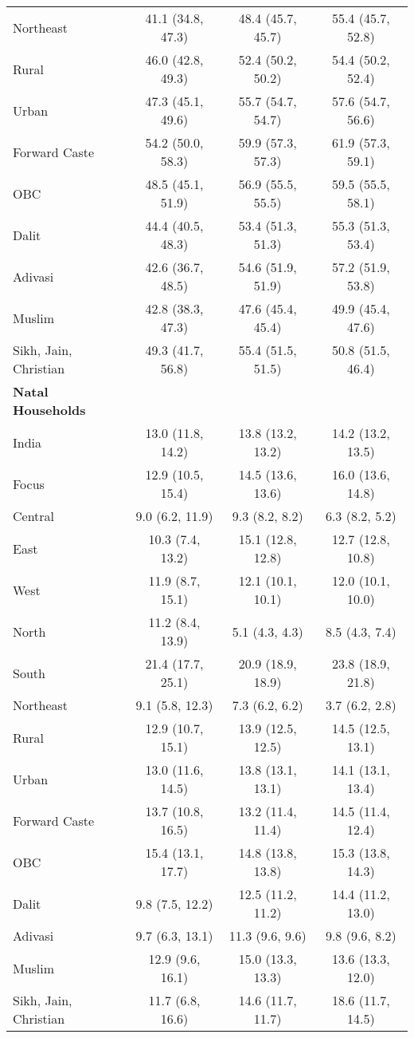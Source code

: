 \begin{tabular}{lccc}
Northeast&41.1 (34.8, 47.3)&48.4 (45.7, 45.7)&55.4 (45.7, 52.8)\\
Rural&46.0 (42.8, 49.3)&52.4 (50.2, 50.2)&54.4 (50.2, 52.4)\\
Urban&47.3 (45.1, 49.6)&55.7 (54.7, 54.7)&57.6 (54.7, 56.6)\\
Forward Caste&54.2 (50.0, 58.3)&59.9 (57.3, 57.3)&61.9 (57.3, 59.1)\\
OBC&48.5 (45.1, 51.9)&56.9 (55.5, 55.5)&59.5 (55.5, 58.1)\\
Dalit&44.4 (40.5, 48.3)&53.4 (51.3, 51.3)&55.3 (51.3, 53.4)\\
Adivasi&42.6 (36.7, 48.5)&54.6 (51.9, 51.9)&57.2 (51.9, 53.8)\\
Muslim&42.8 (38.3, 47.3)&47.6 (45.4, 45.4)&49.9 (45.4, 47.6)\\
Sikh, Jain, Christian&49.3 (41.7, 56.8)&55.4 (51.5, 51.5)&50.8 (51.5, 46.4)\\
\textbf{Natal Households}&&&\\
India&13.0 (11.8, 14.2)&13.8 (13.2, 13.2)&14.2 (13.2, 13.5)\\
Focus&12.9 (10.5, 15.4)&14.5 (13.6, 13.6)&16.0 (13.6, 14.8)\\
Central&9.0 (6.2, 11.9)&9.3 (8.2, 8.2)&6.3 (8.2, 5.2)\\
East&10.3 (7.4, 13.2)&15.1 (12.8, 12.8)&12.7 (12.8, 10.8)\\
West&11.9 (8.7, 15.1)&12.1 (10.1, 10.1)&12.0 (10.1, 10.0)\\
North&11.2 (8.4, 13.9)&5.1 (4.3, 4.3)&8.5 (4.3, 7.4)\\
South&21.4 (17.7, 25.1)&20.9 (18.9, 18.9)&23.8 (18.9, 21.8)\\
Northeast&9.1 (5.8, 12.3)&7.3 (6.2, 6.2)&3.7 (6.2, 2.8)\\
Rural&12.9 (10.7, 15.1)&13.9 (12.5, 12.5)&14.5 (12.5, 13.1)\\
Urban&13.0 (11.6, 14.5)&13.8 (13.1, 13.1)&14.1 (13.1, 13.4)\\
Forward Caste&13.7 (10.8, 16.5)&13.2 (11.4, 11.4)&14.5 (11.4, 12.4)\\
OBC&15.4 (13.1, 17.7)&14.8 (13.8, 13.8)&15.3 (13.8, 14.3)\\
Dalit&9.8 (7.5, 12.2)&12.5 (11.2, 11.2)&14.4 (11.2, 13.0)\\
Adivasi&9.7 (6.3, 13.1)&11.3 (9.6, 9.6)&9.8 (9.6, 8.2)\\
Muslim&12.9 (9.6, 16.1)&15.0 (13.3, 13.3)&13.6 (13.3, 12.0)\\
Sikh, Jain, Christian&11.7 (6.8, 16.6)&14.6 (11.7, 11.7)&18.6 (11.7, 14.5)\\
\bottomrule
\end{tabular}

